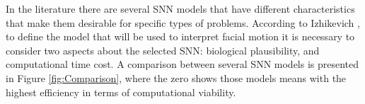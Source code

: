 In the literature there are several SNN models that have different characteristics that make them desirable for specific types of problems. According to Izhikevich \cite{Izhikevich2004}, to define the model that will be used to interpret facial motion it is necessary to consider two aspects about the selected SNN: biological plausibility, and computational time cost. A comparison between several SNN models is presented in Figure \ref{fig:Comparison}, where the zero shows those models means with the highest efficiency in terms of computational viability.%


